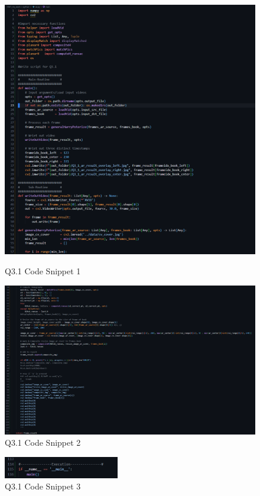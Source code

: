 \documentclass{article}
\begin{document}
	\begin{figure}[H]
	\centering
	\begin{minipage}[b]{0.45\textwidth}
		\centering
		\includegraphics[width=\textwidth]{./Q3_1_ar_cns1.png}  %
		\caption{Q3.1 Code Snippet 1}
		\label{fig:Q331_cns1}
	\end{minipage}
	\hfill  %
	\begin{minipage}[b]{0.45\textwidth}
		\centering
		\includegraphics[width=\textwidth]{./Q3_1_ar_cns2.png}  %
		\caption{Q3.1 Code Snippet 2}
		\label{fig:Q331_cns2}
	\end{minipage}
	\end{figure}
	\begin{figure}[H]		
	\centering
	\includegraphics[width=0.45\textwidth]{./Q3_1_ar_cns3.png}  %
	\caption{Q3.1 Code Snippet 3}
	\label{fig:Q331_cns3}
	\end{figure}		
	
\end{document}
